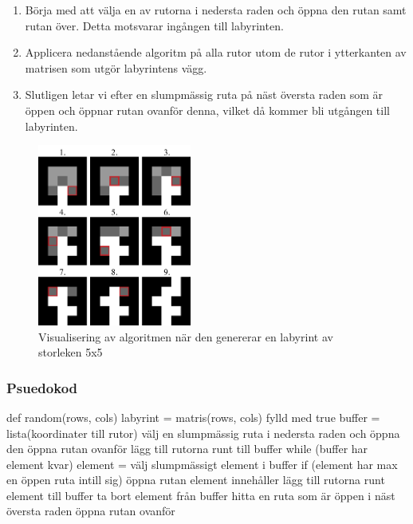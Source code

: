 \begin{enumerate}
	\item Börja med att välja en av rutorna i nedersta raden och öppna den rutan samt rutan över. Detta motsvarar ingången till labyrinten.
	\item Applicera nedanstående algoritm på alla rutor utom de rutor i ytterkanten av matrisen som utgör labyrintens vägg.
	\item Slutligen letar vi efter en slumpmässig ruta på näst översta raden som är öppen och öppnar rutan ovanför denna, vilket då kommer bli utgången till labyrinten.
\end{enumerate}

\begin{figure}[h]
	\begin{center}
		\includegraphics[width=0.45\textwidth]{../img/w09-lab/AlgorithmVisualized.png}
	\end{center}
	\caption{Visualisering av algoritmen när den genererar en labyrint av storleken 5x5}
\end{figure}


\subsubsection{Psuedokod}
\begin{Code}
def random(rows, cols)
	labyrint = matris(rows, cols) fylld med true
	buffer = lista(koordinater till rutor)
	välj en slumpmässig ruta i nedersta raden och öppna den
	öppna rutan ovanför
	lägg till rutorna runt till buffer
	while (buffer har element kvar)
		element = välj slumpmässigt element i buffer
		if (element har max en öppen ruta intill sig)
			öppna rutan element innehåller
			lägg till rutorna runt element till buffer
		ta bort element från buffer
	hitta en ruta som är öppen i näst översta raden
	öppna rutan ovanför
\end{Code}

